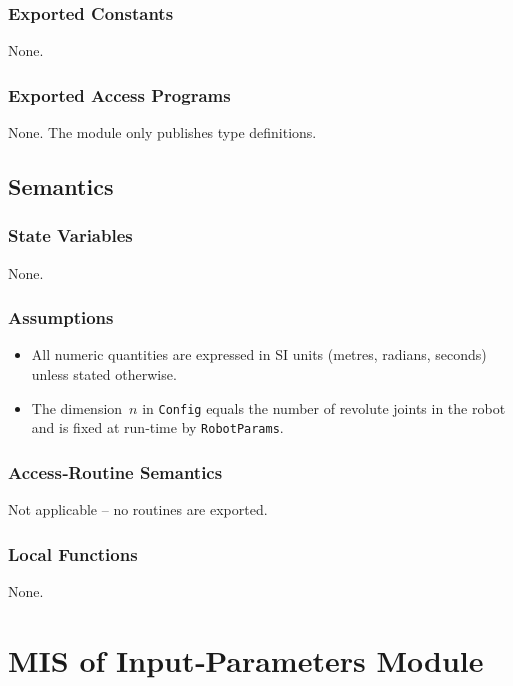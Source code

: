 \documentclass[12pt, titlepage]{article}
\begin{document}
\subsubsection{Exported Constants}
None.

\subsubsection{Exported Access Programs}
None.  The module only publishes type definitions.

\subsection{Semantics}
\subsubsection{State Variables}
None.

\subsubsection{Assumptions}
\begin{itemize}
  \item All numeric quantities are expressed in SI units
        (metres, radians, seconds) unless stated otherwise.
  \item The dimension~$n$ in \texttt{Config} equals the number
        of revolute joints in the robot and is fixed at run‑time
        by \texttt{RobotParams}.
\end{itemize}

\subsubsection{Access‑Routine Semantics}
Not applicable – no routines are exported.

\subsubsection{Local Functions}
None.


\newpage

\section{MIS of Input‑Parameters Module}
\label{mod:input}
\end{document}
